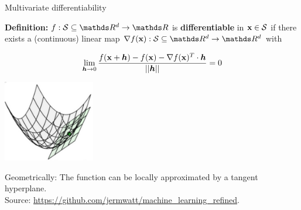 \documentclass[11pt,compress,t,notes=noshow, xcolor=table]{beamer}
\begin{document}
\begin{vbframe}{Multivariate differentiability}

\textbf{Definition:} $f: \mathcal{S}\subseteq \R^d \to \R$ is \textbf{differentiable} in $\mathbf{x} \in \mathcal{S}$ if there exists a (continuous) linear map $\nabla f(\xv): \mathcal{S}\subseteq \R^d \to \R^d$ with %

$$
\lim_{\bm{h} \to 0} \frac{f(\mathbf{x} + \bm{h}) - f(\mathbf{x}) - \nabla f(\mathbf{x})^T \cdot \bm{h}}{||\bm{h}||} = 0
$$

\begin{center}
\includegraphics[width = 0.3\textwidth]{figure_man/differentiability_multivariate.png} \\
\begin{footnotesize}
Geometrically: The function can be locally approximated by a tangent hyperplane. \\
Source: \url{https://github.com/jermwatt/machine_learning_refined}.
\end{footnotesize}
\end{center}

\end{vbframe}
\end{document}
